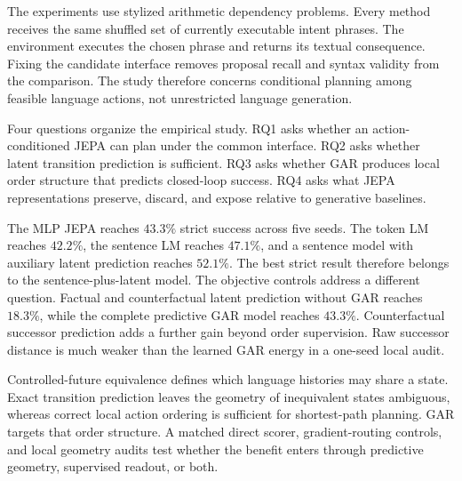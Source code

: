 The experiments use stylized arithmetic dependency problems. Every method receives the same shuffled set of currently executable intent phrases. The environment executes the chosen phrase and returns its textual consequence. Fixing the candidate interface removes proposal recall and syntax validity from the comparison. The study therefore concerns conditional planning among feasible language actions, not unrestricted language generation.

Four questions organize the empirical study. RQ1 asks whether an action-conditioned JEPA can plan under the common interface. RQ2 asks whether latent transition prediction is sufficient. RQ3 asks whether GAR produces local order structure that predicts closed-loop success. RQ4 asks what JEPA representations preserve, discard, and expose relative to generative baselines.

The MLP JEPA reaches $43.3\%$ strict success across five seeds. The token LM reaches $42.2\%$, the sentence LM reaches $47.1\%$, and a sentence model with auxiliary latent prediction reaches $52.1\%$. The best strict result therefore belongs to the sentence-plus-latent model. The objective controls address a different question. Factual and counterfactual latent prediction without GAR reaches $18.3\%$, while the complete predictive GAR model reaches $43.3\%$. Counterfactual successor prediction adds a further gain beyond order supervision. Raw successor distance is much weaker than the learned GAR energy in a one-seed local audit.

Controlled-future equivalence defines which language histories may share a state. Exact transition prediction leaves the geometry of inequivalent states ambiguous, whereas correct local action ordering is sufficient for shortest-path planning. GAR targets that order structure. A matched direct scorer, gradient-routing controls, and local geometry audits test whether the benefit enters through predictive geometry, supervised readout, or both.
